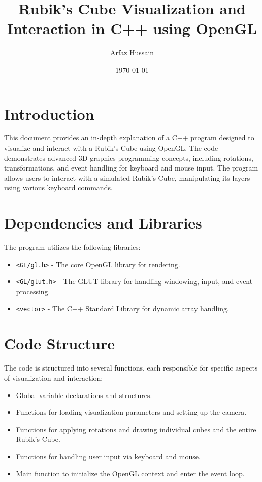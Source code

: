 \documentclass{article}
\title{Rubik's Cube Visualization and Interaction in C++ using OpenGL}
\author{Arfaz Hussain}
\date{\today}
\begin{document}
\maketitle

\section{Introduction}
This document provides an in-depth explanation of a C++ program designed to visualize and interact with a Rubik's Cube using OpenGL. The code demonstrates advanced 3D graphics programming concepts, including rotations, transformations, and event handling for keyboard and mouse input. The program allows users to interact with a simulated Rubik's Cube, manipulating its layers using various keyboard commands.

\section{Dependencies and Libraries}
The program utilizes the following libraries:
\begin{itemize}
    \item \texttt{<GL/gl.h>} - The core OpenGL library for rendering.
    \item \texttt{<GL/glut.h>} - The GLUT library for handling windowing, input, and event processing.
    \item \texttt{<vector>} - The C++ Standard Library for dynamic array handling.
\end{itemize}

\section{Code Structure}
The code is structured into several functions, each responsible for specific aspects of visualization and interaction:
\begin{itemize}
    \item Global variable declarations and structures.
    \item Functions for loading visualization parameters and setting up the camera.
    \item Functions for applying rotations and drawing individual cubes and the entire Rubik's Cube.
    \item Functions for handling user input via keyboard and mouse.
    \item Main function to initialize the OpenGL context and enter the event loop.
\end{itemize}
\end{document}
